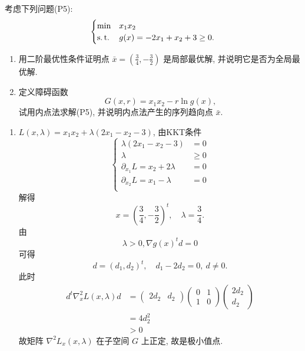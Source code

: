 \begin{Problem}
    考虑下列问题(P5):
    \[\begin{cases}
        \min &x_1x_2\\
        \operatorname{s.t.} &g(x) = -2x_1 + x_2 + 3 \ge 0.
    \end{cases}\]
    \begin{enumerate}
        \item 用二阶最优性条件证明点 $\bar{x} = \left(\frac{3}{4}, -\frac{3}{2}\right)$ 是局部最优解, 并说明它是否为全局最优解.
        \item 定义障碍函数 \[G(x, r) = x_1x_2 - r\ln g(x)\text{,}\]试用内点法求解(P5), 并说明内点法产生的序列趋向点 $\bar{x}$.
    \end{enumerate}

    \Answer \text{}
    \begin{enumerate}
        \item $L(x, \lambda) = x_1x_2 + \lambda(2x_1 - x_2 - 3)$, 由KKT条件
        \[\begin{cases}
            \lambda(2x_1 - x_2 - 3) &= 0\\
            \lambda &\ge 0\\
            \partial_{x_1}L = x_2 + 2\lambda &= 0\\
            \partial_{x_2}L = x_1 - \lambda &= 0\\
        \end{cases}\]
        解得 
        \[x = \left(\frac{3}{4}, -\frac{3}{2}\right)^t, \quad \lambda = \dfrac{3}{4}.\]
        由 \[\lambda > 0, \nabla g(x)^td = 0\]
        可得 
        \[d = (d_1, d_2)^t, \quad  d_1 - 2d_2 = 0,\ d \neq 0.\] 
        此时 
        \begin{align*}
            d^t\nabla^2_xL(x, \lambda)d &= \begin{pmatrix}
                2d_2 & d_2
            \end{pmatrix} \begin{pmatrix}
                0 & 1 \\ 1 & 0
            \end{pmatrix} \begin{pmatrix}
                2d_2 \\ d_2
            \end{pmatrix}\\
            &=4d_2^2\\
            &> 0
        \end{align*} 
        故矩阵 $\nabla^2L_x(x, \lambda)$ 在子空间 $G$ 上正定, 故是极小值点.


\end{enumerate}
\end{Problem}

